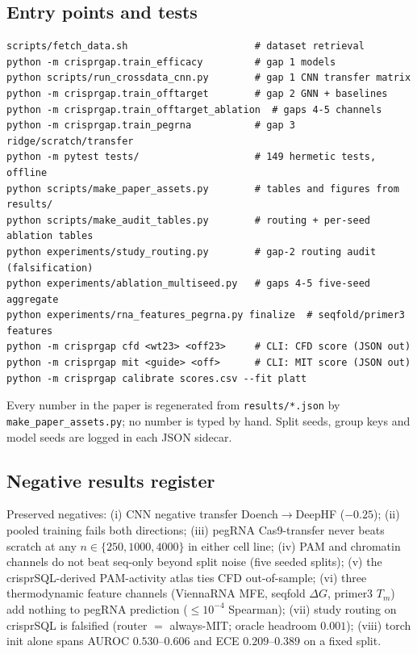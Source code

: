 \subsection{Entry points and tests}
\begin{verbatim}
scripts/fetch_data.sh                      # dataset retrieval
python -m crisprgap.train_efficacy         # gap 1 models
python scripts/run_crossdata_cnn.py        # gap 1 CNN transfer matrix
python -m crisprgap.train_offtarget        # gap 2 GNN + baselines
python -m crisprgap.train_offtarget_ablation  # gaps 4-5 channels
python -m crisprgap.train_pegrna           # gap 3 ridge/scratch/transfer
python -m pytest tests/                    # 149 hermetic tests, offline
python scripts/make_paper_assets.py        # tables and figures from results/
python scripts/make_audit_tables.py        # routing + per-seed ablation tables
python experiments/study_routing.py        # gap-2 routing audit (falsification)
python experiments/ablation_multiseed.py   # gaps 4-5 five-seed aggregate
python experiments/rna_features_pegrna.py finalize  # seqfold/primer3 features
python -m crisprgap cfd <wt23> <off23>     # CLI: CFD score (JSON out)
python -m crisprgap mit <guide> <off>      # CLI: MIT score (JSON out)
python -m crisprgap calibrate scores.csv --fit platt
\end{verbatim}
Every number in the paper is regenerated from \texttt{results/*.json} by
\texttt{make\_paper\_assets.py}; no number is typed by hand. Split seeds,
group keys and model seeds are logged in each JSON sidecar.

\subsection{Negative results register}
Preserved negatives: (i) CNN negative transfer Doench$\to$DeepHF
($-0.25$); (ii) pooled training fails both directions; (iii) pegRNA
Cas9-transfer never beats scratch at any $n \in \{250, 1000, 4000\}$ in
either cell line; (iv) PAM and chromatin channels do not beat
seq-only beyond split noise (five seeded splits); (v) the
crisprSQL-derived PAM-activity atlas ties CFD out-of-sample; (vi) three
thermodynamic feature channels (ViennaRNA MFE, seqfold $\Delta G$,
primer3 $T_m$) add nothing to pegRNA prediction ($\le 10^{-4}$
Spearman); (vii) study routing on crisprSQL is falsified (router
$=$ always-MIT; oracle headroom $0.001$); (viii) torch init alone spans
AUROC $0.530$--$0.606$ and ECE $0.209$--$0.389$ on a fixed split.
